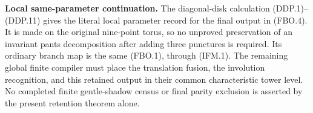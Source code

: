 \par\medskip\noindent\textbf{Local same-parameter continuation.}\quad
The diagonal-disk calculation (DDP.1)--(DDP.11) gives the
literal local parameter record for the final output in
(FBO.4).  It is made on the original nine-point torus, so
no unproved preservation of an invariant pants decomposition
after adding three punctures is required.  Its ordinary
branch map is the same (FBO.1), through (IFM.1).
The remaining global finite compiler must place the translation
fusion, the involution recognition, and this retained output
in their common characteristic tower level.  No completed
finite gentle-shadow census or final parity exclusion is
asserted by the present retention theorem alone.
